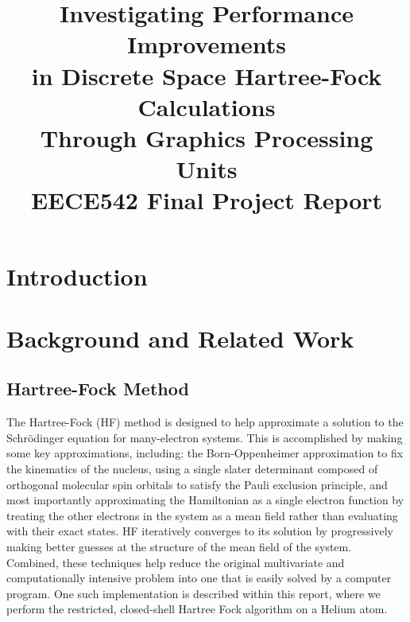 \documentclass[journal, twoside]{IEEEtran}
\begin{document}

\title{Investigating Performance Improvements\\in Discrete Space Hartree-Fock Calculations\\Through Graphics Processing Units\\{\large EECE542 Final Project Report}}
\author{
}

%
{}
\maketitle

\section{Introduction}

\lipsum[1]

\section{Background and Related Work}

\lipsum[1]

\subsection{Hartree-Fock Method}

The Hartree-Fock (HF) method \cite{szabo-ostlund} is designed to help approximate a solution to the Schr\"{o}dinger equation for many-electron systems. This is accomplished by making some key approximations, including: the Born-Oppenheimer approximation to fix the kinematics of the nucleus, using a single slater determinant composed of orthogonal molecular spin orbitals to satisfy the Pauli exclusion principle, and most importantly approximating the Hamiltonian as a single electron function by treating the other electrons in the system as a mean field rather than evaluating with their exact states. HF iteratively converges to its solution by progressively making better guesses at the structure of the mean field of the system. Combined, these techniques help reduce the original multivariate and computationally intensive problem into one that is easily solved by a computer program. One such implementation is described within this report, where we perform the restricted, closed-shell Hartree Fock algorithm on a Helium atom.
\end{document}
